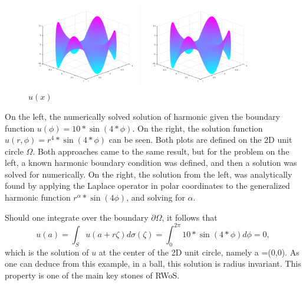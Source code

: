 \begin{figure}[h]
  \centering
  \begin{minipage}[b]{0.4\textwidth}
  \includegraphics[width=5cm]{styles/sinBoundarysovle.png}
  \caption{$u_{sol}(x)$}%
  \label{fig:swingSolve}
\end{minipage}
  \begin{minipage}[b]{0.4\textwidth}
  \includegraphics[width=5cm]{styles/swing_function_plot.png}
  \caption{$u(x)$}%
  \label{fig:swingPlot}
  \end{minipage}
\end{figure}

On the left, the numerically solved solution of harmonic  given the boundary
function $u(\phi)=10*\sin(4*\phi)$.  On the right, the solution function $u(r,\phi)=r^{4}*\sin(4*\phi)$
can be seen. Both plots are defined on the 2D unit circle $\Omega$.  Both approaches
came to the same result, but for the problem on the left, a known harmonic boundary
condition was defined, and then a solution was solved for numerically.  On the right,
the solution from the left, was analytically found by applying the Laplace operator
in polar coordinates to the generalized harmonic function $r^{\alpha}*\sin(4\phi)$,
and solving for $\alpha$.

Should one integrate over the boundary $\partial \Omega$, it follows that \begin{equation}
u(a) = \int_{S}u(a + r\zeta)d\sigma(\zeta) = \int_{0}^{2\pi} 10*\sin(4*\phi)d\phi = 0,
\label{eq:radinvar}
\end{equation}
which is the solution of $u$ at the center of the 2D unit circle,
namely a =(0,0). As one can deduce from this example, in a ball, this solution is
radius invariant.  This property is one of the main key stones of \Gls{RWoS}.
